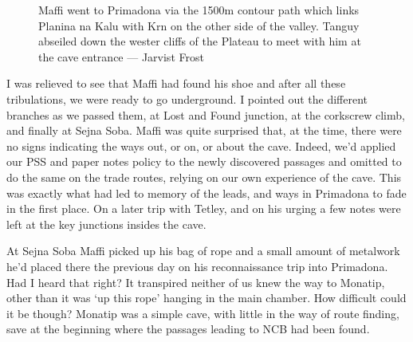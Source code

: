 \begin{figure}[t!]
\checkoddpage \ifoddpage \forcerectofloat \else \forceversofloat \fi
\centering
{}
\caption{Maffi went to Primadona via the 1500m contour path which links Planina na Kalu with Krn on the other side of the valley. Tanguy abseiled down the wester cliffs of the Plateau to meet with him at the cave entrance --- Jarvist Frost}
\label{forest}
\end{figure}

I was relieved to see that Maffi had found his shoe and after all these tribulations, we were ready to go underground. I pointed out the different branches as we passed them, at Lost and Found junction, at the corkscrew climb, and finally at Sejna Soba. Maffi was quite surprised that, at the time, there were no signs indicating the ways out, or on, or about the cave. Indeed, we’d applied our PSS and paper notes policy to the newly discovered passages and omitted to do the same on the trade routes, relying on our own experience of the cave. This was exactly what had led to memory of the leads, and ways in Primadona to fade in the first place. On a later trip with Tetley, and on his urging a few notes were left at the key junctions insides the cave.

At Sejna Soba Maffi picked up his bag of rope and a small amount of metalwork he’d placed there the previous day on his reconnaissance trip into Primadona. Had I heard that right? It transpired neither of us knew the way to Monatip, other than it was ‘up this rope’ hanging in the main chamber. How difficult could it be though? Monatip was a simple cave, with little in the way of route finding, save at the beginning where the passages leading to NCB had been found.

